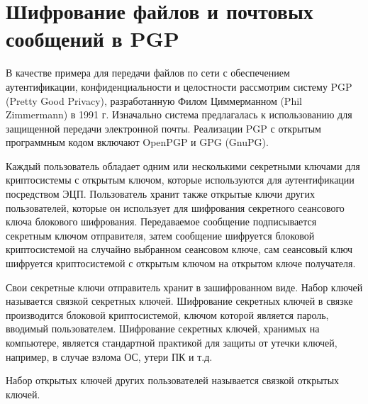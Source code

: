 ﻿\section{Шифрование файлов и почтовых сообщений в PGP}

В качестве примера для передачи файлов по сети с обеспечением аутентификации, конфиденциальности и целостности рассмотрим систему PGP (Pretty Good Privacy), разработанную Филом Циммерманном (Phil Zimmermann) в 1991 г. Изначально система предлагалась к использованию для защищенной передачи электронной почты. Реализации PGP с открытым программным кодом включают OpenPGP и GPG (GnuPG).

Каждый пользователь обладает одним или несколькими секретными ключами для криптосистемы с открытым ключом, которые используются для аутентификации посредством ЭЦП.  Пользователь хранит также открытые ключи других пользователей, которые он использует для шифрования секретного сеансового ключа блокового шифрования. Передаваемое сообщение подписывается секретным ключом отправителя, затем сообщение шифруется блоковой криптосистемой на случайно выбранном сеансовом ключе, сам сеансовый ключ шифруется криптосистемой с открытым ключом на открытом ключе получателя.

Свои секретные ключи отправитель хранит в зашифрованном виде. Набор ключей называется связкой секретных ключей. Шифрование секретных ключей в связке производится блоковой криптосистемой, ключом которой является пароль, вводимый пользователем. Шифрование секретных ключей, хранимых на компьютере, является стандартной практикой для защиты от утечки ключей, например, в случае взлома ОС, утери ПК и т.д.

Набор открытых ключей других пользователей называется связкой открытых ключей.

